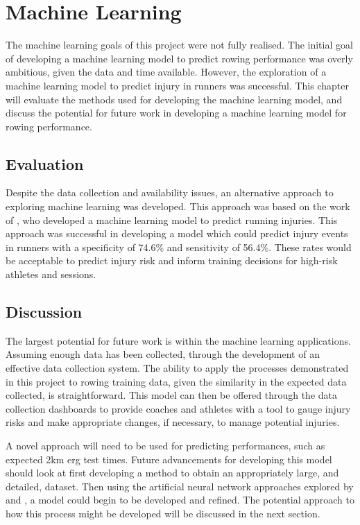 \section{Machine Learning}
The machine learning goals of this project were not fully realised. The initial goal of developing a machine learning model to predict rowing performance was overly ambitious, given the data and time available. However, the exploration of a machine learning model to predict injury in runners was successful. This chapter will evaluate the methods used for developing the machine learning model, and discuss the potential for future work in developing a machine learning model for rowing performance.

\subsection{Evaluation}
Despite the data collection and availability issues, an alternative approach to exploring machine learning was developed. This approach was based on the work of \textcite{Lovdal2021}, who developed a machine learning model to predict running injuries. This approach was successful in developing a model which could predict injury events in runners with a specificity of 74.6\% and sensitivity of 56.4\%. These rates would be acceptable to predict injury risk and inform training decisions for high-risk athletes and sessions.  

\subsection{Discussion}
The largest potential for future work is within the machine learning applications. Assuming enough data has been collected, through the development of an effective data collection system. The ability to apply the processes demonstrated in this project to rowing training data, given the similarity in the expected data collected, is straightforward. This model can then be offered through the data collection dashboards to provide coaches and athletes with a tool to gauge injury risks and make appropriate changes, if necessary, to manage potential injuries.

A novel approach will need to be used for predicting performances, such as expected 2km erg test times. Future advancements for developing this model should look at first developing a method to obtain an appropriately large, and detailed, dataset. Then using the artificial neural network approaches explored by \textcite{Edelmannnusser2002} and \textcite{Churchill2014}, a model could begin to be developed and refined. The potential approach to how this process might be developed will be discussed in the next section.

